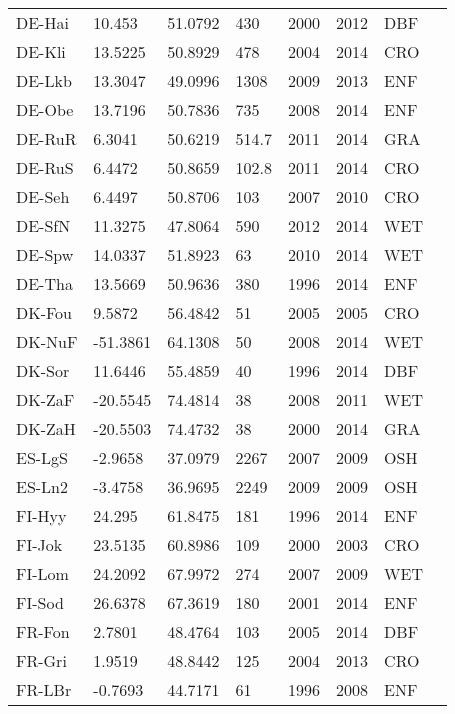 \documentclass[a4paper, 12pt]{article}
\begin{document}
\begin{longtable}{l l l l l l l l}
DE-Hai & 10.453 & 51.0792 & 430 & 2000 & 2012 & DBF & \cite{DE-Hai} \\ 
DE-Kli & 13.5225 & 50.8929 & 478 & 2004 & 2014 & CRO & \cite{DE-Kli} \\ 
DE-Lkb & 13.3047 & 49.0996 & 1308 & 2009 & 2013 & ENF & \cite{DE-Lkb} \\ 
DE-Obe & 13.7196 & 50.7836 & 735 & 2008 & 2014 & ENF & \cite{DE-Obe} \\ 
DE-RuR & 6.3041 & 50.6219 & 514.7 & 2011 & 2014 & GRA & \cite{DE-RuR} \\ 
DE-RuS & 6.4472 & 50.8659 & 102.8 & 2011 & 2014 & CRO & \cite{DE-RuS} \\ 
DE-Seh & 6.4497 & 50.8706 & 103 & 2007 & 2010 & CRO & \cite{DE-Seh} \\ 
DE-SfN & 11.3275 & 47.8064 & 590 & 2012 & 2014 & WET & \cite{DE-SfN} \\ 
DE-Spw & 14.0337 & 51.8923 & 63 & 2010 & 2014 & WET & \cite{DE-Spw} \\ 
DE-Tha & 13.5669 & 50.9636 & 380 & 1996 & 2014 & ENF & \cite{DE-Tha} \\ 
DK-Fou & 9.5872 & 56.4842 & 51 & 2005 & 2005 & CRO & \cite{DK-Fou} \\ 
DK-NuF & -51.3861 & 64.1308 & 50 & 2008 & 2014 & WET & \cite{DK-NuF} \\ 
DK-Sor & 11.6446 & 55.4859 & 40 & 1996 & 2014 & DBF & \cite{DK-Sor} \\ 
DK-ZaF & -20.5545 & 74.4814 & 38 & 2008 & 2011 & WET & \cite{DK-ZaF} \\ 
DK-ZaH & -20.5503 & 74.4732 & 38 & 2000 & 2014 & GRA & \cite{DK-ZaH} \\ 
ES-LgS & -2.9658 & 37.0979 & 2267 & 2007 & 2009 & OSH & \cite{ES-LgS} \\ 
ES-Ln2 & -3.4758 & 36.9695 & 2249 & 2009 & 2009 & OSH & \cite{ES-Ln2} \\ 
FI-Hyy & 24.295 & 61.8475 & 181 & 1996 & 2014 & ENF & \cite{FI-Hyy} \\ 
FI-Jok & 23.5135 & 60.8986 & 109 & 2000 & 2003 & CRO & \cite{FI-Jok} \\ 
FI-Lom & 24.2092 & 67.9972 & 274 & 2007 & 2009 & WET & \cite{FI-Lom} \\ 
FI-Sod & 26.6378 & 67.3619 & 180 & 2001 & 2014 & ENF & \cite{FI-Sod} \\ 
FR-Fon & 2.7801 & 48.4764 & 103 & 2005 & 2014 & DBF & \cite{FR-Fon} \\ 
FR-Gri & 1.9519 & 48.8442 & 125 & 2004 & 2013 & CRO & \cite{FR-Gri} \\ 
FR-LBr & -0.7693 & 44.7171 & 61 & 1996 & 2008 & ENF & \cite{FR-LBr} \\ 

\end{longtable}
\end{document}
